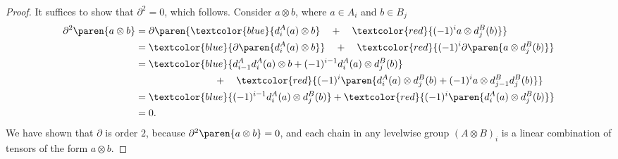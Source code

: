 \documentclass[twosided]{ccg-pset}
\begin{document}
\begin{enumerate}
        \begin{proof}
            It suffices to show that $\partial^2 = 0$, which follows. Consider $a \otimes b$, where $a \in A_i$ and $b \in B_j$
            \begin{align*}
                \partial^2\paren{a \otimes b} 
                       &  = \partial\paren{\textcolor{blue}{d_i^A(a) \otimes b} \quad + \quad  \textcolor{red}{(-1)^i a \otimes d^B_j(b)}} \\
                       &  = \textcolor{blue}{\partial\paren{d_i^A(a) \otimes b} }\quad + \quad  \textcolor{red}{(-1)^i \partial\paren{a \otimes d^B_j(b)}} \\
                       &  = \textcolor{blue}{ d_{i-1}^A d_i^A(a) \otimes b + (-1)^{i-1} d_i^A(a) \otimes d^B_{j}(b) } \\
                       &  \hspace{8em}  + \quad \textcolor{red}{ (-1)^{i}\paren{d_{i}^A(a) \otimes d^B_j(b) + (-1)^{i} a \otimes d^B_{j-1}d^B_j(b)} } \\
                       &  = \textcolor{blue}{ (-1)^{i-1} d_i^A(a) \otimes d^B_{j}(b) } + \textcolor{red}{ (-1)^{i}\paren{d_{i}^A(a) \otimes d^B_j(b)} } \\
                       & = 0.
            \end{align*}
            We have shown that $\partial$ is order $2$, because $\partial^2 \paren{a \otimes b} = 0$, and 
            each chain in any levelwise group $(A \otimes B)_i$ is a linear combination of tensors of the form $a \otimes b$. 
        \end{proof}


\end{enumerate}
\end{document}
